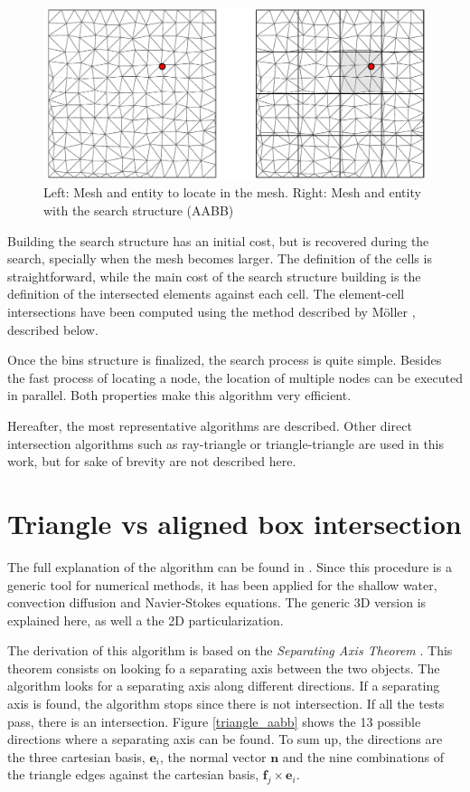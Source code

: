 \begin{figure}
    \centering
    \includegraphics[width=.9\textwidth]{img/search/bins_search.pdf}
    \caption{Left: Mesh and entity to locate in the mesh. Right: Mesh and entity with the search structure (AABB)}
    \label{bins_search}
\end{figure}

Building the search structure has an initial cost, but is recovered during the search, specially when the mesh becomes larger. The definition of the cells is straightforward, while the main cost of the search structure building is the definition of the intersected elements against each cell. The element-cell intersections have been computed using the method described by Möller \cite{moller2004}, described below.

Once the bins structure is finalized, the search process is quite simple. Besides the fast process of locating a node, the location of multiple nodes can be executed in parallel. Both properties make this algorithm very efficient.

Hereafter, the most representative algorithms are described. Other direct intersection algorithms such as ray-triangle \cite{moller1997, jimenez2014} or triangle-triangle \cite{moller1997tritri} are used in this work, but for sake of brevity are not described here.




\section{Triangle vs aligned box intersection}

The full explanation of the algorithm can be found in \cite{moller2004}. Since this procedure is a generic tool for numerical methods, it has been applied for the shallow water, convection diffusion and Navier-Stokes equations. The generic 3D version is explained here, as well a the 2D particularization.

The derivation of this algorithm is based on the \emph{Separating Axis Theorem} \cite{gottschalk1996}. This theorem consists on looking fo a separating axis between the two objects. 
The algorithm looks for a separating axis along different directions. If a separating axis is found, the algorithm stops since there is not intersection. If all the tests pass, there is an intersection.
Figure \ref{triangle_aabb} shows the 13 possible directions where a separating axis can be found. To sum up, the directions are the three cartesian basis, $\mathbf{e}_i$, the normal vector $\mathbf{n}$ and the nine combinations of the triangle edges against the cartesian basis, $\mathbf{f}_j \times \mathbf{e}_i$.

